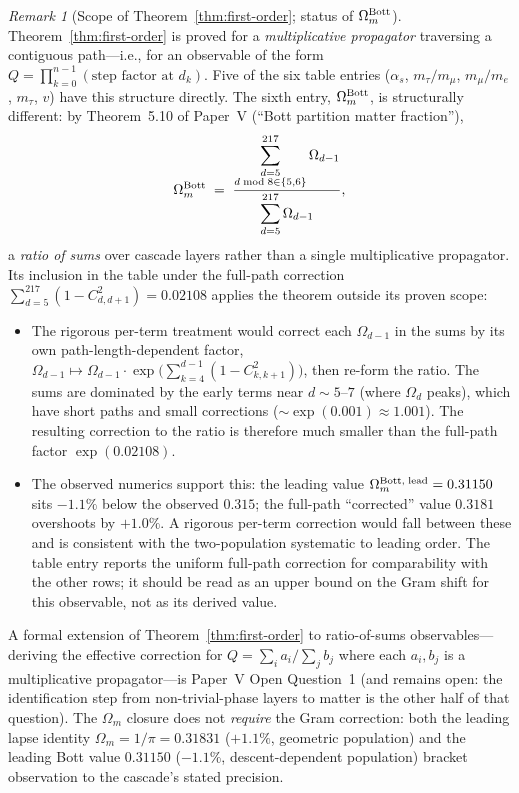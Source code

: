 \documentclass[12pt,a4paper]{article}
\theoremstyle{remark}
\newtheorem*{remark}{Remark}
\begin{document}
\begin{remark}[Scope of Theorem~\ref{thm:first-order}; status of $\Omega_m^{\rm Bott}$]\label{rem:sp9-status}
Theorem~\ref{thm:first-order} is proved for a \emph{multiplicative
propagator} traversing a contiguous path---i.e., for an observable of
the form $Q = \prod_{k=0}^{n-1}(\text{step factor at }d_k)$. Five of the
six table entries ($\alpha_s$, $m_\tau/m_\mu$, $m_\mu/m_e$, $m_\tau$,
$v$) have this structure directly. The sixth entry,
$\Omega_m^{\rm Bott}$, is structurally different: by
Theorem~5.10 of Paper~V (``Bott partition matter fraction''),
\[
\Omega_m^{\rm Bott}
\;=\;
\frac
{\displaystyle\sum_{\substack{d=5\\ d\bmod 8\in\{5,6\}}}^{217}\Omega_{d-1}}
{\displaystyle\sum_{d=5}^{217}\Omega_{d-1}},
\]
a \emph{ratio of sums} over cascade layers rather than a single
multiplicative propagator. Its inclusion in the table under the
full-path correction $\sum_{d=5}^{217}(1-C^2_{d,d+1}) = 0.02108$
applies the theorem outside its proven scope:
\begin{itemize}
\item The rigorous per-term treatment would correct each
$\Omega_{d-1}$ in the sums by its own path-length-dependent factor,
$\Omega_{d-1}\mapsto\Omega_{d-1}\cdot
\exp\bigl(\sum_{k=4}^{d-1}(1-C^2_{k,k+1})\bigr)$, then re-form the
ratio. The sums are dominated by the early terms near $d\sim 5$--$7$
(where $\Omega_d$ peaks), which have short paths and small corrections
($\sim\exp(0.001)\approx 1.001$). The resulting correction to the
ratio is therefore much smaller than the full-path factor
$\exp(0.02108)$.
\item The observed numerics support this: the leading value
$\Omega_m^{\rm Bott,\;lead}=0.31150$ sits $-1.1\%$ below the
observed $0.315$; the full-path ``corrected'' value $0.3181$
overshoots by $+1.0\%$. A rigorous per-term correction would fall
between these and is consistent with the two-population systematic
to leading order. The table entry reports the uniform full-path
correction for comparability with the other rows; it should be read
as an upper bound on the Gram shift for this observable, not as its
derived value.
\end{itemize}
A formal extension of Theorem~\ref{thm:first-order} to ratio-of-sums
observables---deriving the effective correction for
$Q=\sum_i a_i/\sum_j b_j$ where each $a_i,b_j$ is a multiplicative
propagator---is Paper~V Open Question~1 (and remains open: the
identification step from non-trivial-phase layers to matter is the
other half of that question). The $\Omega_m$ closure does not
\emph{require} the Gram correction: both the leading lapse identity
$\Omega_m=1/\pi=0.31831$ ($+1.1\%$, geometric population) and the
leading Bott value $0.31150$ ($-1.1\%$, descent-dependent population)
bracket observation to the cascade's stated precision.
\end{remark}
\end{document}
